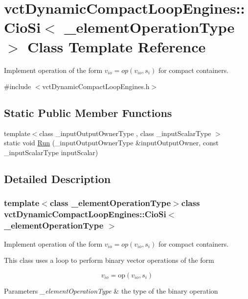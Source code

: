 \hypertarget{classvct_dynamic_compact_loop_engines_1_1_cio_si}{\section{vct\-Dynamic\-Compact\-Loop\-Engines\-:\-:Cio\-Si$<$ \-\_\-element\-Operation\-Type $>$ Class Template Reference}
\label{classvct_dynamic_compact_loop_engines_1_1_cio_si}
}


Implement operation of the form $ v_{io} = op(v_{io}, s_i)$ for compact containers.  




{\ttfamily \#include $<$vct\-Dynamic\-Compact\-Loop\-Engines.\-h$>$}

\subsection*{Static Public Member Functions}
\begin{DoxyCompactItemize}
\item 
{\footnotesize template$<$class \-\_\-input\-Output\-Owner\-Type , class \-\_\-input\-Scalar\-Type $>$ }\\static void \hyperlink{classvct_dynamic_compact_loop_engines_1_1_cio_si_a541c1dc2827cf5c69322acaaefd024f0}{Run} (\-\_\-input\-Output\-Owner\-Type \&input\-Output\-Owner, const \-\_\-input\-Scalar\-Type input\-Scalar)
\end{DoxyCompactItemize}


\subsection{Detailed Description}
\subsubsection*{template$<$class \-\_\-element\-Operation\-Type$>$class vct\-Dynamic\-Compact\-Loop\-Engines\-::\-Cio\-Si$<$ \-\_\-element\-Operation\-Type $>$}

Implement operation of the form $ v_{io} = op(v_{io}, s_i)$ for compact containers. 

This class uses a loop to perform binary vector operations of the form

\[ v_{io} = \mathrm{op}(v_{io}, s_{i}) \]


\begin{DoxyParams}{Parameters}
{\em \-\_\-element\-Operation\-Type} & the type of the binary operation \\
\hline
\end{DoxyParams}


